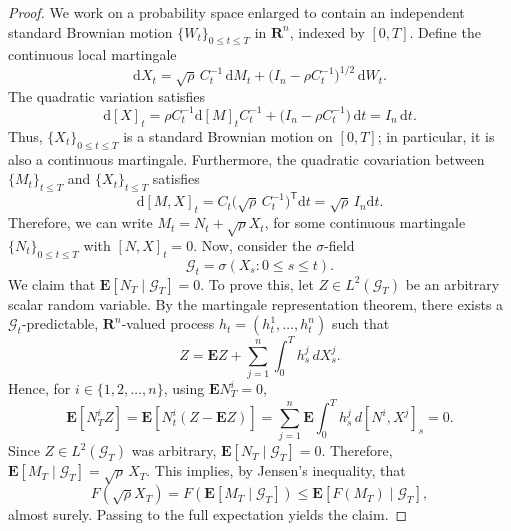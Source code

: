 \documentclass[11pt]{amsart}
\newcommand{\R}{\mathbf R}
\newcommand{\E}{\mathbf E}
\newcommand{\cG}{\mathcal{G}}
\newcommand{\1}{\mathbf 1}
\newcommand{\ud}{\mathrm{d}}
\theoremstyle{plain}
\begin{document}
\begin{proof}
We work on a probability space enlarged to contain an independent standard Brownian motion $\{W_t\}_{0 \leq t \leq T}$ in $\R^n$, indexed by $[0, T]$. Define the continuous local martingale
\[
\ud X_t
= \sqrt{\rho}\,C_t^{-1}\, \ud M_t
+
 \Big(I_n-\rho C_t^{-1}\Big)^{1/2} \, \ud W_t.
\]
The quadratic variation satisfies
\[
\ud [X]_t
=
\rho C_t^{-1} \ud [M]_t C_t^{-1}
+
\Big(I_n-\rho C_t^{-1}\Big) \, \ud t 
=
I_n \, \ud t.
\]
Thus, $\{X_t\}_{0 \leq t \leq T}$ is a standard Brownian motion on $[0, T]$; in particular, it is also a continuous martingale.
Furthermore, the quadratic covariation between $\{M_t\}_{t \leq T}$ and $\{X_t\}_{t \leq T}$ satisfies
\[
\ud[M,X]_t
=
C_t\Big(\sqrt{\rho}\,C_t^{-1}\Big)^{\mathsf T} 
\ud t 
=
\sqrt{\rho}\,I_n \ud t.
\]
Therefore, we can write $M_t = N_t + \sqrt{\rho} X_t$, 
for some continuous martingale $\{N_t\}_{0 \leq t \leq T}$ with $[N,X]_t=0$. 
Now, consider the $\sigma$-field
\[
\cG_t = \sigma(X_s:0\leq s\leq t).
\]
We claim that $\E[N_T \mid  \cG_T]=0$. 
To prove this, let $Z\in L^2(\cG_T)$ be an arbitrary scalar random variable. By the martingale
representation theorem, there exists a $\cG_t$-predictable, $\R^n$-valued process $h_t = (h_t^1, \dots, h_t^n)$ such that
\[
Z=\E Z+ \sum_{j=1}^n \int_0^T h_s^j \,dX_s^j.
\]
Hence, for $i \in \{1, 2, \dots, n\}$, using $\E N_T^i = 0$,  
\[
\E[N_T^i Z] = \E[N_t^i (Z-\E Z)]
=
\sum_{j=1}^n \E \int_0^T h_s^{j}\,d[N^i,X^j]_s
=
0.
\]
Since $Z \in L^2(\cG_T)$ was arbitrary, $\E[N_T \mid \cG_T] = 0$.  Therefore, $\E[M_T\mid\mathcal{G}_T]=\sqrt{\rho}\,X_T$.  
This implies, by Jensen's inequality, that 
\[
F(\sqrt{\rho} X_T) = F(\E[M_T \mid \cG_T]) \leq \E[F(M_T) \mid \cG_T],
\]
almost surely. Passing to the full expectation yields the claim.
\end{proof}
\end{document}
